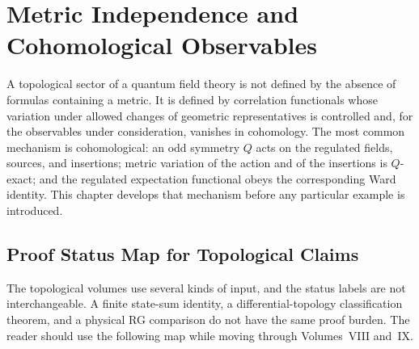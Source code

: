\chapter{Metric Independence and Cohomological Observables}
\label{ch:tqft-metric-independence}

\ConventionsEuclidean

A topological sector of a quantum field theory is not defined by the absence
of formulas containing a metric.  It is defined by correlation functionals
whose variation under allowed changes of geometric representatives is
controlled and, for the observables under consideration, vanishes in
cohomology.  The most common mechanism is cohomological: an odd symmetry
\(Q\) acts on the regulated fields, sources, and insertions; metric variation
of the action and of the insertions is \(Q\)-exact; and the regulated
expectation functional obeys the corresponding Ward identity.  This chapter
develops that mechanism before any particular example is introduced.

\section{Proof Status Map for Topological Claims}
\label{sec:tqft-proof-status-map}

The topological volumes use several kinds of input, and the status labels are
not interchangeable.  A finite state-sum identity, a differential-topology
classification theorem, and a physical RG comparison do not have the same proof
burden.  The reader should use the following map while moving through
Volumes~VIII and~IX.

